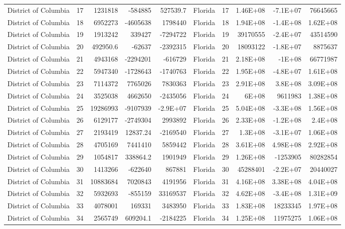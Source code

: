 \begin{table}[]
\begin{tabular}{lrrrrlrrrr}
		District of Columbia &  17 & 1231818 & -584885 & 527539.7 & Florida &  17 & 1.46E+08 & -7.1E+07 & 76645665 \\
		District of Columbia &  18 & 6952273 & -4605638 & 1798440 & Florida &  18 & 1.94E+08 & -1.4E+08 & 1.62E+08 \\
		District of Columbia &  19 & 1913242 & 339427 & -7294722 & Florida &  19 & 39170555 & -2.4E+07 & 43514590 \\
		District of Columbia &  20 & 492950.6 & -62637 & -2392315 & Florida &  20 & 18093122 & -1.8E+07 & 8875637 \\
		District of Columbia &  21 & 4943168 & -2294201 & -616729 & Florida &  21 & 2.18E+08 & -1E+08 & 66771987 \\
		District of Columbia &  22 & 5947340 & -1728643 & -1740763 & Florida &  22 & 1.95E+08 & -4.8E+07 & 1.61E+08 \\
		District of Columbia &  23 & 7114372 & 7765026 & 7830363 & Florida &  23 & 2.91E+08 & 3.8E+08 & 3.09E+08 \\
		District of Columbia &  24 & 3525038 & 4662650 & -2435056 & Florida &  24 & 6E+08 & 9611983 & 1.38E+08 \\
		District of Columbia &  25 & 19286993 & -9107939 & -2.9E+07 & Florida &  25 & 5.04E+08 & -3.3E+08 & 1.56E+08 \\
		District of Columbia &  26 & 6129177 & -2749304 & 2993892 & Florida &  26 & 2.33E+08 & -1.2E+08 & 2.4E+08 \\
		District of Columbia &  27 & 2193419 & 12837.24 & -2169540 & Florida &  27 & 1.3E+08 & -3.1E+07 & 1.06E+08 \\
		District of Columbia &  28 & 4705169 & 7441410 & 5859442 & Florida &  28 & 3.61E+08 & 4.98E+08 & 2.92E+08 \\
		District of Columbia &  29 & 1054817 & 338864.2 & 1901949 & Florida &  29 & 1.26E+08 & -1253905 & 80282854 \\
		District of Columbia &  30 & 1413266 & -622640 & 867881 & Florida &  30 & 45288401 & -2.2E+07 & 20440027 \\
		District of Columbia &  31 & 10883684 & 7020843 & 4191956 & Florida &  31 & 4.16E+08 & 3.38E+08 & 4.04E+08 \\
		District of Columbia &  32 & 5932693 & -855159 & 33169537 & Florida &  32 & 4.62E+08 & -3.4E+08 & 1.31E+09 \\
		District of Columbia &  33 & 4078001 & 169331 & 3483950 & Florida &  33 & 1.83E+08 & 18233345 & 1.97E+08 \\
		District of Columbia &  34 & 2565749 & 609204.1 & -2184225 & Florida &  34 & 1.25E+08 & 11975275 & 1.06E+08
	\end{tabular}
\end{table}

